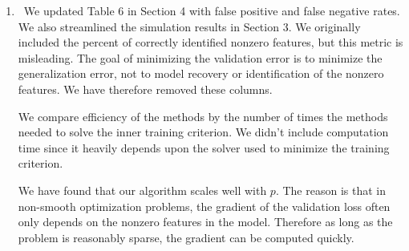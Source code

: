 \documentclass[]{article}
\newcommand{\reply}{\item[]\ }
\begin{document}
\begin{enumerate}
		\reply We updated Table 6 in Section 4 with false positive and false negative rates. We also streamlined the simulation results in Section 3. We originally included the percent of correctly identified nonzero features, but this metric is misleading. The goal of minimizing the validation error is to minimize the generalization error, not to model recovery or identification of the nonzero features. We have therefore removed these columns.
		
		We compare efficiency of the methods by the number of times the methods needed to solve the inner training criterion. We didn't include computation time since it heavily depends upon the solver used to minimize the training criterion.
		
		We have found that our algorithm scales well with $p$. The reason is that in non-smooth optimization problems, the gradient of the validation loss often only depends on the nonzero features in the model. Therefore as long as the problem is reasonably sparse, the gradient can be computed quickly.
		
	\end{enumerate}
\end{document}

